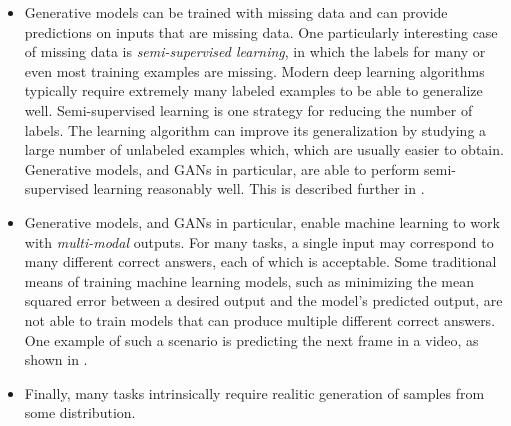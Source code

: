 \begin{itemize}
\item Generative models can be trained with missing data and can provide predictions
  on inputs that are missing data.
  One particularly interesting case of missing data is {\em semi-supervised learning},
  in which the labels for many or even most training examples are missing.
  Modern deep learning algorithms typically require extremely many labeled examples
  to be able to generalize well.
  Semi-supervised learning is one strategy for reducing the number of labels.
  The learning algorithm can improve its generalization by studying a large number
  of unlabeled examples which, which are usually easier to obtain.
  Generative models, and GANs in particular, are able to perform semi-supervised
  learning reasonably well. This is described further in .

\item Generative models, and GANs in particular, enable machine learning to work with
  {\em multi-modal} outputs.
  For many tasks, a single input may correspond to many different correct answers,
  each of which is acceptable.
Some traditional means of training machine learning models, such as minimizing the
mean squared error between a desired output and the model's predicted output, are
not able to train models that can produce multiple different correct answers.
One example of such a scenario is predicting the next frame in a video, as shown
in .

\item Finally, many tasks intrinsically require realitic generation of samples from
  some distribution.
\end{itemize}

